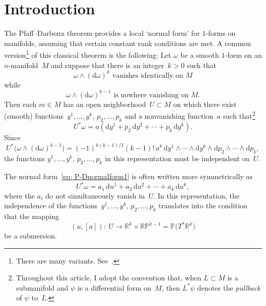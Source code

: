 \documentclass[pdftex]{sigma}
\renewcommand{\d}{\mathrm{d}}%
\newcommand{\bbR}{{\mathbb R}}
\newcommand{\bbP}{{\mathbb P}}
\newcommand{\w}{\wedge}
\numberwithin{equation}{section}
\begin{document}


\renewcommand{\thefootnote}{\arabic{footnote}}
\setcounter{footnote}{0}

\section{Introduction}%

The Pfaff--Darboux theorem provides a local `normal form'
for $1$-forms on manifolds, assuming that certain constant rank
conditions are met. A common version\footnote{There are many variants. See~\cite[Chapter II, Section~3]{MR1083148}.}
of this classical theorem
is the following: Let $\omega$ be a smooth $1$-form on an $n$-manifold~$M$
and suppose that there is an integer~$k>0$ such that
\[
\text{$\omega\w(\d\omega)^k$ vanishes identically on $M$}
\]
while
\[
\text{$\omega\w(\d\omega)^{k-1}$ is nowhere vanishing on $M$.}
\]
Then each $m\in M$ has an open neighborhood~$U\subset M$
on which there exist (smooth) functions~$y^1,\ldots,y^k$, $p_2,\ldots,p_k$
and a nonvanishing function~$a$ such that\footnote{Throughout this article, I adopt the convention that,
when $L\subset M$ is a submanifold and $\psi$ is a differential
form on~$M$, then $L^*\psi$ denotes the \emph{pullback} of $\psi$ to~$L$.}
\begin{equation}\label{eq: P-Dnormalform1}
U^*\omega = a (\d y^1 + p_2\,\d y^2 + \cdots + p_k\,\d y^k).
\end{equation}
Since
\[
U^*\bigl(\omega\w(\d\omega)^{k-1}\bigr)
=(-1)^{k(k-1)/2}(k{-}1)!\,a^k\,\d y^1\w\cdots\w\d y^k\w\d p_2\w\cdots\w\d p_k,
\]
the functions $y^1,\ldots,y^k$, $p_2,\ldots,p_k$
in this representation must be independent on~$U$.

The normal form~\eqref{eq: P-Dnormalform1}
is often written more symmetrically as
\begin{equation}\label{eq: P-Dnormalform2}
U^*\omega = a_1\,\d u^1 + a_2\,\d u^2 + \cdots + a_k\,\d u^k,
\end{equation}
where the $a_i$ do not simultaneously vanish in~$U$.
In this representation, the independence
of the functions~$y^1,\ldots,y^k$, $p_2,\ldots,p_k$
translates into the condition that the mapping
\begin{equation*}%
(u,[a])\colon \ U\to \bbR^k\times\bbR\bbP^{k-1}
= \bbP\bigl(T^*\bbR^k\bigr)
\end{equation*}
be a submersion.
\end{document}

